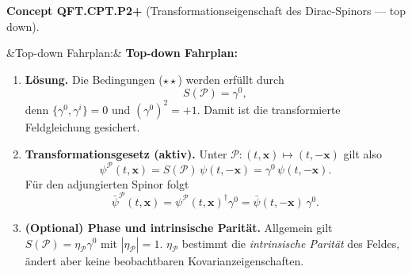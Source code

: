 \documentclass[10pt, letterpaper]{article}
\newenvironment{romanenum}[1][]
  {%
    \ifx&#1&
    \else
      \textbf{#1}\quad
    \fi
    \begin{enumerate}[label=\roman*)]
  }
  {%
    \end{enumerate}%
  }
\newcommand{\CustomHeading}[3]{%
  \par\medskip\noindent%
  \textbf{#1 #2} \textnormal{(#3)}.\enskip%
}
\newenvironment{CONC}[2]{\begin{unitbox}\CustomHeading{Concept}{#1}{#2}}{\end{unitbox}}
\begin{document}
\begin{CONC}{QFT.CPT.P2+}{Transformationseigenschaft des Dirac-Spinors — top down}
\begin{romanenum}[Top-down Fahrplan:]
\item \textbf{Lösung.}
Die Bedingungen ($\star\star$) werden erfüllt durch
\[
\boxed{S(\mathcal P)=\gamma^0,}
\]
denn $\{\gamma^0,\gamma^i\}=0$ und $(\gamma^0)^2=+1$.  
Damit ist die transformierte Feldgleichung gesichert.

\item \textbf{Transformationsgesetz (aktiv).}
Unter $\mathcal P:(t,\mathbf x)\mapsto (t,-\mathbf x)$ gilt also
\[
\boxed{\quad
\psi^{\mathcal P}(t,\mathbf x)
=S(\mathcal P)\,\psi(t,-\mathbf x)
=\gamma^0\,\psi(t,-\mathbf x).
\quad}
\]
Für den adjungierten Spinor folgt
\[
\bar\psi^{\mathcal P}(t,\mathbf x)
=\psi^{\mathcal P}(t,\mathbf x)^\dagger\gamma^0
=\bar\psi(t,-\mathbf x)\,\gamma^0.
\]

\item \textbf{(Optional) Phase und intrinsische Parität.}
Allgemein gilt $S(\mathcal P)=\eta_{\mathcal P}\gamma^0$ mit $|\eta_{\mathcal P}|=1$.  
$\eta_{\mathcal P}$ bestimmt die \emph{intrinsische Parität} des Feldes, ändert aber keine beobachtbaren Kovarianzeigenschaften.
\end{romanenum}
\end{CONC}
\end{document}
